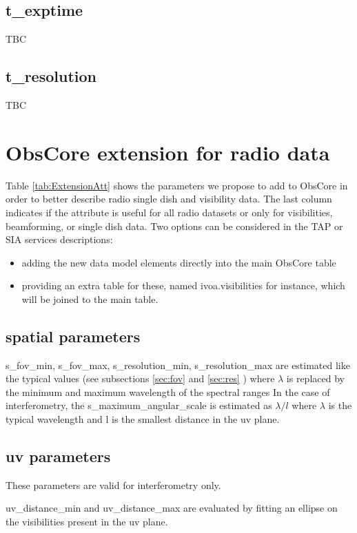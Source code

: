\documentclass[11pt,a4paper]{ivoa}
\begin{document}
\subsection{t\_exptime}
TBC

\subsection{t\_resolution}
TBC 

\section{ObsCore extension for radio data}

Table \ref{tab:ExtensionAtt} shows the %
parameters we propose to add to ObsCore in order to better describe radio single dish and visibility data.
The last column indicates if the attribute is useful for all radio datasets or only for visibilities, beamforming, or single dish data.
Two options can be considered in the TAP or SIA services descriptions: 
\begin{itemize}
\item adding the new data model elements directly into the main ObsCore table
\item providing an extra table for these, named ivoa.visibilities for instance,  which will 
be joined to the main table. 
\end{itemize}

\subsection{spatial parameters}

s\_fov\_min, s\_fov\_max, 
s\_resolution\_min, s\_resolution\_max are estimated like the typical values (see subsections 
\ref{sec:fov} and \ref{sec:res} ) where $\lambda$ is replaced by the minimum and maximum 
wavelength of the spectral ranges
In the case of interferometry, the s\_maximum\_angular\_scale is estimated as $\lambda/l$ where $\lambda$ is the typical 
wavelength and l is the smallest distance in the uv plane. 

\subsection{uv parameters}
These parameters are valid for interferometry only.

uv\_distance\_min and uv\_distance\_max are evaluated by fitting an ellipse on the 
visibilities present in the uv plane.
\end{document}

